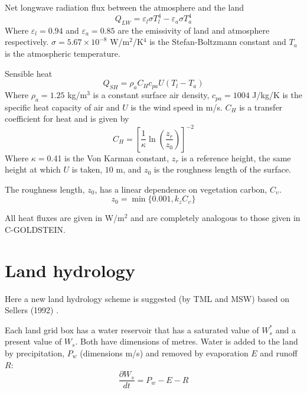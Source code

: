 \documentclass[10pt,a4paper]{report}
\begin{document}
Net longwave radiation flux between the atmosphere and the land
\begin{equation}
Q_{LW}=\varepsilon_{l}\sigma T_{l}^4 - \varepsilon_{a}\sigma
T_{a}^4
\end{equation}
Where $\varepsilon_{l}=0.94$ and $\varepsilon_{a}=0.85$ are the
emissivity of land and atmosphere respectively. $\sigma=5.67\times
10^{-8}$ W/m$^2$/K$^4$ is the Stefan-Boltzmann constant and $T_a$
is the atmospheric temperature.

Sensible heat
\begin{equation}
Q_{SH}=\rho_a C_{H} c_{pa} U (T_l - T_a)
\end{equation}
Where $\rho_a=1.25$ kg/m$^3$ is a constant surface air density,
$c_{pa}=1004$ J/kg/K is the specific heat capacity of air and $U$
is the wind speed in m/s. $C_{H}$ is a transfer coefficient for
heat and is given by
\begin{equation}
C_{H}=\left[\frac{1}{\kappa}\ln(\frac{z_r}{z_0})\right]^{-2}
\end{equation}
Where $\kappa=$0.41 is the Von Karman constant, $z_r$ is a reference
height, the same height at which $U$ is taken, $10$ m, and $z_0$ is
the roughness length of the surface.

The roughness length, $z_0$, has a linear dependence on vegetation
carbon, $C_{\upsilon}$.
\begin{equation}
z_0={\min\{0.001,k_{z}C_{\upsilon}\}}
\end{equation}

All heat fluxes are given in W/m$^2$ and are completely analogous
to those given in C-GOLDSTEIN.

\section{Land hydrology}
Here a new land hydrology scheme is suggested (by TML and MSW)
based on Sellers (1992) \cite{Sellers}.


Each land grid box has a water reservoir that has a saturated value
of $W_{s}^*$ and a present value of $W_s$. Both have dimensions of
metres. Water is added to the land by precipitation, $P_w$
(dimensions m/s) and removed by evaporation $E$ and runoff $R$:
\begin{equation}
\frac{\partial W_s}{dt}=P_w - E - R
\end{equation}
\end{document}
